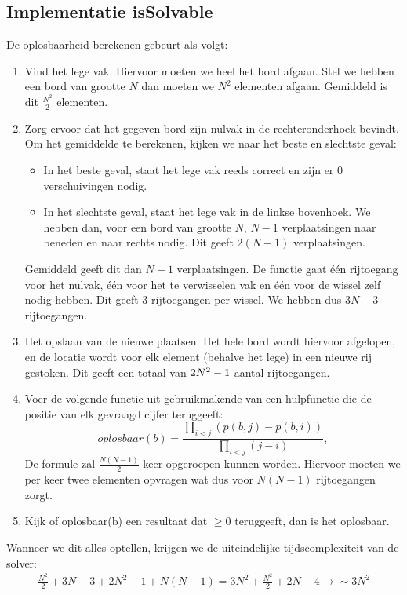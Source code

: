 \documentclass[a4paper]{article}
\numberwithin{equation}{section}
\begin{document}
        \subsection{Implementatie isSolvable}
        De oplosbaarheid berekenen gebeurt als volgt:
        \begin{enumerate}
            \item Vind het lege vak. Hiervoor moeten we heel het bord afgaan. Stel we hebben een bord van grootte $N$ dan moeten we $N^2$ elementen afgaan.
            Gemiddeld is dit $\frac{N^2}{2}$ elementen.
            \item Zorg ervoor dat het gegeven bord zijn nulvak in de rechteronderhoek bevindt. Om het gemiddelde te berekenen, kijken we naar het beste en slechtste geval:
            \begin{itemize}
                \item In het beste geval, staat het lege vak reeds correct en zijn er $0$ verschuivingen nodig.
                \item In het slechtste geval, staat het lege vak in de linkse bovenhoek. We hebben dan, voor een bord van grootte $N$, $N - 1$ verplaatsingen naar beneden en naar rechts nodig. Dit geeft $2(N-1)$ verplaatsingen.
            \end{itemize}
            Gemiddeld geeft dit dan $N - 1$ verplaatsingen. De functie gaat \'e\'en rijtoegang voor het nulvak, \'e\'en voor het te verwisselen vak en \'e\'en voor de wissel zelf nodig hebben. Dit geeft $3$ rijtoegangen per wissel. We hebben dus $3N-3$ rijtoegangen.
            \item Het opslaan van de nieuwe plaatsen. Het hele bord wordt hiervoor afgelopen, en de locatie wordt voor elk element (behalve het lege) in een nieuwe rij gestoken.  Dit geeft een totaal van $2N^2 \-- 1$ aantal rijtoegangen.
            \item Voer de volgende functie uit gebruikmakende van een hulpfunctie die de positie van elk gevraagd cijfer teruggeeft:
            \begin{equation}
                oplosbaar(b) = \frac{\prod_{i<j} (p(b, j)-p(b, i))}{\prod_{i<j}(j-i)},
            \end{equation}
            De formule zal $\frac{N(N-1)}{2}$ keer opgeroepen kunnen worden. Hiervoor moeten we per keer twee elementen opvragen wat dus voor $N(N-1)$ rijtoegangen zorgt.  
            \item Kijk of oplosbaar(b) een resultaat dat $\geq 0$ teruggeeft, dan is het oplosbaar.
        \end{enumerate}
        Wanneer we dit alles optellen, krijgen we de uiteindelijke tijdscomplexiteit van de solver:
        \begin{align*}
            \frac{N^2}{2} + 3N -3 + 2N^2 - 1 + N(N-1) = 3N^2 + \frac{N^2}{2} +2N -4 \rightarrow \sim 3N^2
        \end{align*}
        
            
    \pagebreak
    
    
\end{document}

